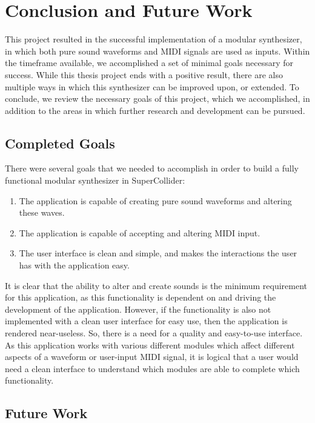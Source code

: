 \chapter{Conclusion and Future Work}\label{conclusion}

This project resulted in the successful implementation of a modular synthesizer, in which both pure sound waveforms and MIDI signals are used as inputs. Within the timeframe available, we accomplished a set of minimal goals necessary for success. While this thesis project ends with a positive result, there are also multiple ways in which this synthesizer can be improved upon, or extended. To conclude, we review the necessary goals of this project, which we accomplished, in addition to the areas in which further research and development can be pursued. 

\section{Completed Goals}

There were several goals that we needed to accomplish in order to build a fully functional modular synthesizer in SuperCollider:

\begin{enumerate}
	\item The application is capable of creating pure sound waveforms and altering these waves.
	\item The application is capable of accepting and altering MIDI input.
	\item The user interface is clean and simple, and makes the interactions the user has with the application easy.
\end{enumerate}

It is clear that the ability to alter and create sounds is the minimum requirement for this application, as this functionality is dependent on and driving the development of the application. However, if the functionality is also not implemented with a clean user interface for easy use, then the application is rendered near-useless. So, there is a need for a quality and easy-to-use interface. As this application works with various different modules which affect different aspects of a waveform or user-input MIDI signal, it is logical that a user would need a clean interface to understand which modules are able to complete which functionality. 

\section{Future Work}

